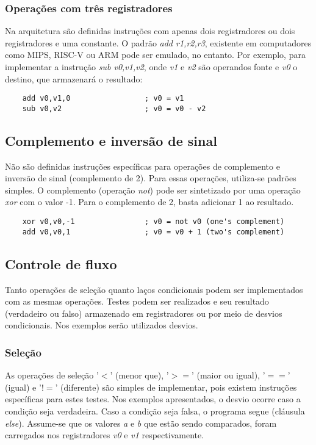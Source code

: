 \documentclass[11pt,a4paper]{report}
\begin{document}
\subsubsection{Operações com três registradores}

Na arquitetura são definidas instruções com apenas dois registradores
ou dois registradores e uma constante. O padrão \textit{add r1,r2,r3},
existente em computadores como MIPS, RISC-V ou ARM pode ser emulado,
no entanto. Por exemplo, para implementar a instrução
\textit{sub v0,v1,v2}, onde \textit{v1} e \textit{v2} são operandos
fonte e \textit{v0} o destino, que armazenará o resultado:

\begin{verbatim}
    add v0,v1,0                 ; v0 = v1
    sub v0,v2                   ; v0 = v0 - v2
\end{verbatim}

\subsection{Complemento e inversão de sinal}

Não são definidas instruções específicas para operações de complemento
e inversão de sinal (complemento de 2). Para essas operações, utiliza-se
padrões simples. O complemento (operação \textit{not}) pode ser
sintetizado por uma operação \textit{xor} com o valor -1. Para o
complemento de 2, basta adicionar 1 ao resultado.

\begin{verbatim}
    xor v0,v0,-1                ; v0 = not v0 (one's complement)
    add v0,v0,1                 ; v0 = v0 + 1 (two's complement)
\end{verbatim}

\subsection{Controle de fluxo}

Tanto operações de seleção quanto laços condicionais podem ser implementados
com as mesmas operações. Testes podem ser realizados e seu resultado
(verdadeiro ou falso) armazenado em registradores ou por meio de desvios
condicionais. Nos exemplos serão utilizados desvios.

\subsubsection{Seleção}

As operações de seleção '$<$' (menor que), '$>=$' (maior ou igual),
'$==$' (igual) e '$!=$' (diferente) são simples de implementar, pois existem
instruções específicas para estes testes. Nos exemplos apresentados, o
desvio ocorre caso a condição seja verdadeira. Caso a condição seja
falsa, o programa segue (cláusula \textit{else}). Assume-se que os
valores \textit{a} e \textit{b} que estão sendo comparados, foram
carregados nos registradores \textit{v0} e \textit{v1} respectivamente.
\end{document}
